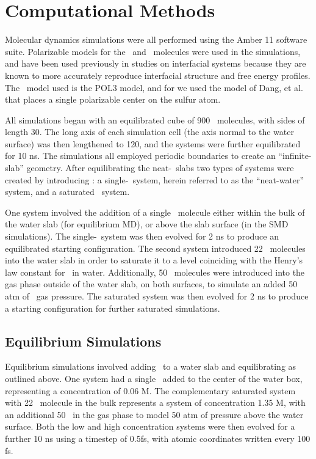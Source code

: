 \section{Computational Methods}

Molecular dynamics simulations were all performed using the Amber 11 software suite.\cite{Case2010} Polarizable models for the \wat~and \suldiox~molecules were used in the simulations, and have been used previously in studies on interfacial systems because they are known to more accurately reproduce interfacial structure and free energy profiles.\cite{Wick2007,Rivera2006,Dang1998} The \wat~model used is the POL3 model,\cite{Caldwell1995} and for \suldiox we used the model of Dang, et al. that places a single polarizable center on the sulfur atom.\cite{Baer2010}

All simulations began with an equilibrated cube of 900 \wat~molecules, with sides of length 30\angs. The long axis of each simulation cell (the axis normal to the water surface) was then lengthened to 120\angs, and the systems were further equilibrated for 10 ns. The simulations all employed periodic boundaries to create an ``infinite-slab'' geometry. After equilibrating the neat-\wat~slabs two types of systems were created by introducing \suldiox: a single-\suldiox~system, herein referred to as the ``neat-water'' system, and a saturated \suldiox~system. 

One system involved the addition of a single \suldiox~molecule either within the bulk of the water slab (for equilibrium MD), or above the slab surface (in the SMD simulations). The single-\suldiox~system was then evolved for 2 ns to produce an equilibrated starting configuration. The second system introduced 22 \suldiox~molecules into the water slab in order to saturate it to a level coinciding with the Henry's law constant for \suldiox~in water. Additionally, 50 \suldiox~molecules were introduced into the gas phase outside of the water slab, on both surfaces, to simulate an added 50 atm of \suldiox~gas pressure. The saturated system was then evolved for 2 ns to produce a starting configuration for further saturated simulations.

\subsection{Equilibrium Simulations}

Equilibrium simulations involved adding \suldiox~to a water slab and equilibrating as outlined above. One system had a single \suldiox~added to the center of the water box, representing a concentration of 0.06 M. The complementary saturated system with 22 \suldiox~molecule in the bulk represents a system of concentration 1.35 M, with an additional 50 \suldiox~in the gas phase to model 50 atm of pressure above the water surface. Both the low and high concentration systems were then evolved for a further 10 ns using a timestep of 0.5fs, with atomic coordinates written every 100 fs.

